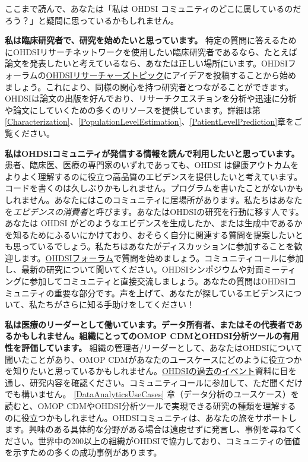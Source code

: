 \documentclass[
  11pt]{book}
\theoremstyle{definition}
\theoremstyle{definition}
\theoremstyle{definition}
\theoremstyle{definition}
\theoremstyle{remark}
\begin{document}
ここまで読んで、あなたは「私は OHDSI コミュニティのどこに属しているのだろう？」と疑問に思っているかもしれません。

\textbf{私は臨床研究者で、研究を始めたいと思っています。} 特定の質問に答えるためにOHDSIリサーチネットワークを使用したい臨床研究者であるなら、たとえば論文を発表したいと考えているなら、あなたは正しい場所にいます。OHDSIフォーラムの\href{https://forums.ohdsi.org/c/researchers}{OHDSIリサーチャーズトピック}にアイデアを投稿することから始めましょう。これにより、同様の関心を持つ研究者とつながることができます。OHDSIは論文の出版を好んでおり、リサーチクエスチョンを分析や迅速に分析や論文にしていくための多くのリソースを提供しています。詳細は第\ref{Characterization}、\ref{PopulationLevelEstimation}、\ref{PatientLevelPrediction}章をご覧ください。

\textbf{私はOHDSIコミュニティが発信する情報を読んで利用したいと思っています。} 患者、臨床医、医療の専門家のいずれであっても、OHDSI は健康アウトカムをよりよく理解するのに役立つ高品質のエビデンスを提供したいと考えています。コードを書くのは久しぶりかもしれません。プログラムを書いたことがないかもしれません。あなたにはこのコミュニティに居場所があります。私たちはあなたを\emph{エビデンスの消費者}と呼びます。あなたはOHDSIの研究を行動に移す人です。あなたは OHDSI がどのようなエビデンスを生成したか、または生成中であるかを知るためにふるいにかけており、おそらく自分に関連する質問を提案したいとも思っているでしょう。私たちはあなたがディスカッションに参加することを歓迎します。\href{http://forums.ohdsi.org}{OHDSIフォーラム}で質問を始めましょう。コミュニティコールに参加し、最新の研究について聞いてください。OHDSIシンポジウムや対面ミーティングに参加してコミュニティと直接交流しましょう。あなたの質問はOHDSIコミュニティの重要な部分です。声を上げて、あなたが探しているエビデンスについて、私たちがさらに知る手助けをしてください！

\textbf{私は医療のリーダーとして働いています。データ所有者、またはその代表者であるかもしれません。組織にとってのOMOP CDMとOHDSI分析ツールの有用性を評価しています。} 組織の管理者/リーダーとして、あなたはOHDSIについて聞いたことがあり、OMOP CDMがあなたのユースケースにどのように役立つかを知りたいと思っているかもしれません。\href{https://www.ohdsi.org/past-events/}{OHDSIの過去のイベント}資料に目を通し、研究内容を確認ください。コミュニティコールに参加して、ただ聞くだけでも構いません。 \ref{DataAnalyticsUseCases} 章（データ分析のユースケース）を読むと、OMOP CDMやOHDSI分析ツールで実現できる研究の種類を理解するのに役立つかもしれません。OHDSIコミュニティは、あなたの旅をサポートします。興味のある具体的な分野がある場合は遠慮せずに発言し、事例を尋ねてください。世界中の200以上の組織がOHDSIで協力しており、コミュニティの価値を示すための多くの成功事例があります。
\end{document}

